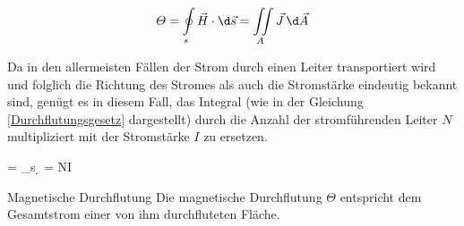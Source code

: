 \begin{frame}
{		\begin{equation}
			\varTheta = \oint\limits_s \vec{H}\cdot \d\vec{s} = \iint\limits_A \vec{J}\,\d\vec{A}\label{Durchflutung}
		\end{equation}
		
		Da in den allermeisten Fällen der Strom durch einen Leiter transportiert wird und folglich die Richtung des Stromes als auch die Stromstärke eindeutig bekannt sind, genügt es in diesem Fall, das Integral (wie in der Gleichung \ref{Durchflutungsgesetz} dargestellt) durch die Anzahl der stromführenden Leiter $N$ multipliziert mit der Stromstärke $I$ zu ersetzen.
		
		\begin{eq}
			\varTheta = \oint\limits_s \cdot \d{} = N\cdot I\label{Durchflutungsgesetz} \qquad [\mathrm{A}]
		\end{eq}
		
		\begin{Merksatz}{Magnetische Durchflutung}
			Die magnetische Durchflutung $\varTheta$ entspricht dem Gesamtstrom einer von ihm durchfluteten Fläche.
		\end{Merksatz}
		
}
\end{frame}
